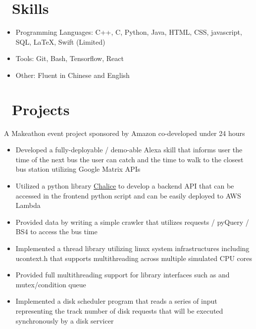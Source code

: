 \documentclass{resume}
\begin{document}

\section{\faCogs\ Skills}
\begin{itemize}[parsep=0.5ex]
  \item Programming Languages: C++, C, Python, Java, HTML, CSS,  javascript, SQL, \LaTeX, Swift (Limited)
  \item Tools: Git, Bash, Tensorflow, React
  \item Other: Fluent in Chinese and English
\end{itemize}

\section{\faWrench\ Projects}
A Makeathon event project sponsored by Amazon co-developed under 24 hours
\begin{itemize}
	\item Developed a fully-deployable / demo-able Alexa skill that informs user the time of the next bus the user can catch and the time to walk to the closest bus station utilizing Google Matrix APIs
	\item Utilized a python library \href{https://github.com/aws/chalice}{\underline{Chalice}} to develop a backend API that can be accessed in the frontend python script and can be easily deployed to AWS Lambda
	\item Provided data by writing a simple crawler that utilizes requests / pyQuery / BS4 to access the bus time
\end{itemize}

\begin{itemize}
	\item Implemented a thread library utilizing linux system infrastructures including ucontext.h that supports multithreading across multiple simulated CPU cores
	\item Provided full multithreading support for library interfaces such as and mutex/condition queue
	\item Implemented a disk scheduler program that reads a series of input representing the track number of disk requests that will be executed synchronously by a disk servicer
\end{itemize}
\end{document}
